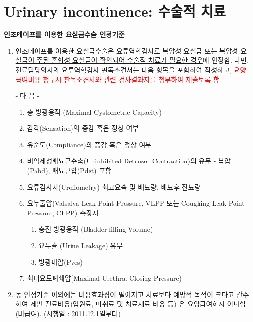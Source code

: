\section{Urinary incontinence: 수술적 치료}
\myde{}{
\begin{itemize}\tightlist
\item[\dsmedical] N393 스트레스요실금
\item[\dsmedical] R3565 요실금수술. 가. 질강을 통한 수술 (2) 기타의 경우 [\myexplfn{3477.58}
\end{itemize}
}
{
\Large \textbf{인조테이프를 이용한 요실금수술 인정기준}\normalsize
\begin{enumerate}[1.]\tightlist
\item 인조테이프를 이용한 요실금수술은 \uline{요류역학검사로 복압성 요실금 또는 복압성 요실금이 주된 혼합성 요실금이 확인되어 수술적 치료가 필요한 경우}에 인정함. 다만, 진료담당의사의 요류역학검사 판독소견서는 다음 항목을 포함하여 작성하고, \textcolor{red}{요양급여비용 청구시 판독소견서와 관련 검사결과지를 첨부하여 제출토록 함.}\par
- 다 음 - 
	\begin{enumerate}[가.]\tightlist
	\item 총 방광용적 (Maximal Cystometric Capacity) 
	\item 감각(Sensation)의 증감 혹은 정상 여부 
	\item 유순도(Compliance)의 증감 혹은 정상 여부 
	\item 비억제성배뇨근수축(Uninhibited Detrusor Contraction)의 유무 - 복압(Pabd), 배뇨근압(Pdet) 포함
	\item 요류검사시(Uroflometry) 최고요속 및 배뇨량, 배뇨후 잔뇨량 
	\item 요누출압(Valsalva Leak Point Pressure, VLPP 또는 Coughing Leak Point Pressure, CLPP) 측정시
		\begin{enumerate}[(1)]\tightlist
		\item 충전 방광용적 (Bladder filling Volume) 
		\item 요누출 (Urine Leakage) 유무 
		\item 방광내압(Pves)
		\end{enumerate}
	\item 최대요도폐쇄압(Maximal Urethral Closing Pressure)
  	\end{enumerate}
\item 동 인정기준 이외에는 비용효과성이 떨어지고 \uline{치료보다 예방적 목적이 크다고 간주하여 제반 진료비용(입원료, 마취료 및 치료재료 비용 등) 은 요양급여하지 아니함(비급여)}.
(시행일 : 2011.12.1일부터)
\end{enumerate}
}
